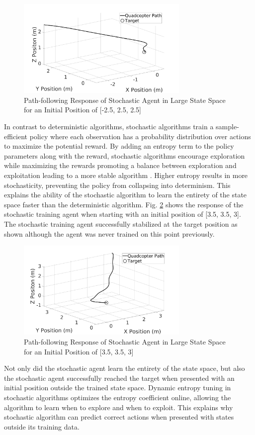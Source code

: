     \begin{figure}[H]
            \centering
            \includegraphics[width=0.735\textwidth]{plots/2_5_1.jpg}
            \caption{Path-following Response of Stochastic Agent in Large State Space for an Initial Position of [-2.5, 2.5, 2.5]}
            \label{S2.5}
    \end{figure}
    In contrast to deterministic algorithms, stochastic algorithms train a sample-efficient policy where each observation has a probability distribution over actions to maximize the potential reward. By adding an entropy term to the policy parameters along with the reward, stochastic algorithms encourage exploration while maximizing the rewards promoting a balance between exploration and exploitation leading to a more stable algorithm \cite{haarnoja2018soft}. Higher entropy results in more stochasticity, preventing the policy from collapsing into determinism. This explains the ability of the stochastic algorithm to learn the entirety of the state space faster than the deterministic algorithm.
    \clearpage
   Fig. \ref{offS4.5} shows the response of the stochastic training agent when starting with an initial position of [3.5, 3.5, 3]. The stochastic training agent successfully stabilized at the target position as shown although the agent was never trained on this point previously. 
    \begin{figure}[H]
            \centering
            \includegraphics[width=0.735\textwidth]{plots/off_sac_2_5.jpg}
            \caption{Path-following Response of Stochastic Agent in Large State Space for an Initial Position of [3.5, 3.5, 3]}
            \label{offS4.5}
    \end{figure}
    Not only did the stochastic agent learn the entirety of the state space, but also the stochastic agent successfully reached the target when presented with an initial position outside the trained state space. Dynamic entropy tuning in stochastic algorithms optimizes the entropy coefficient online, allowing the algorithm to learn when to explore and when to exploit. This explains why stochastic algorithm can predict correct actions when presented with states outside its training data. \clearpage
